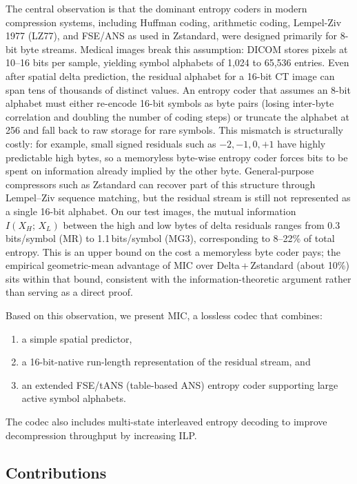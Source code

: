 \documentclass[journal]{IEEEtran}
\begin{document}
The central observation is that the dominant entropy coders in modern
compression systems, including Huffman coding, arithmetic coding, Lempel-Ziv
1977 (LZ77), and FSE/ANS as used in Zstandard, were designed primarily for
8-bit byte streams. Medical images break this assumption: DICOM stores pixels
at 10--16 bits per sample, yielding symbol alphabets of 1,024 to 65,536
entries. Even after spatial delta prediction, the residual alphabet for a
16-bit CT image can span tens of thousands of distinct values. An entropy coder
that assumes an 8-bit alphabet must either re-encode 16-bit symbols as byte
pairs (losing inter-byte correlation and doubling the number of coding steps)
or truncate the alphabet at 256 and fall back to raw storage for rare symbols.
This mismatch is structurally costly: for example, small signed residuals such
as $-2, -1, 0, +1$ have highly predictable high bytes, so a memoryless
byte-wise entropy coder forces bits to be spent on information already implied
by the other byte. General-purpose compressors such as Zstandard can recover
part of this structure through Lempel--Ziv sequence matching, but the residual
stream is still not represented as a single 16-bit alphabet. On our test
images, the mutual information $I(X_H;\,X_L)$ between the high and low bytes
of delta residuals ranges from 0.3\,bits/symbol (MR) to 1.1\,bits/symbol
(MG3), corresponding to 8--22\% of total entropy. This is an upper bound on
the cost a memoryless byte coder pays; the empirical geometric-mean
advantage of MIC over Delta\,+\,Zstandard (about 10\%) sits within that
bound, consistent with the information-theoretic argument rather than
serving as a direct proof.

Based on this observation, we present MIC, a lossless codec that combines:
\begin{enumerate}
  \item a simple spatial predictor,
  \item a 16-bit-native run-length representation of the residual stream, and
  \item an extended FSE/tANS (table-based ANS) entropy coder supporting large
  active symbol alphabets.
\end{enumerate}

The codec also includes multi-state interleaved entropy decoding to improve
decompression throughput by increasing ILP.

\subsection{Contributions}
\end{document}
